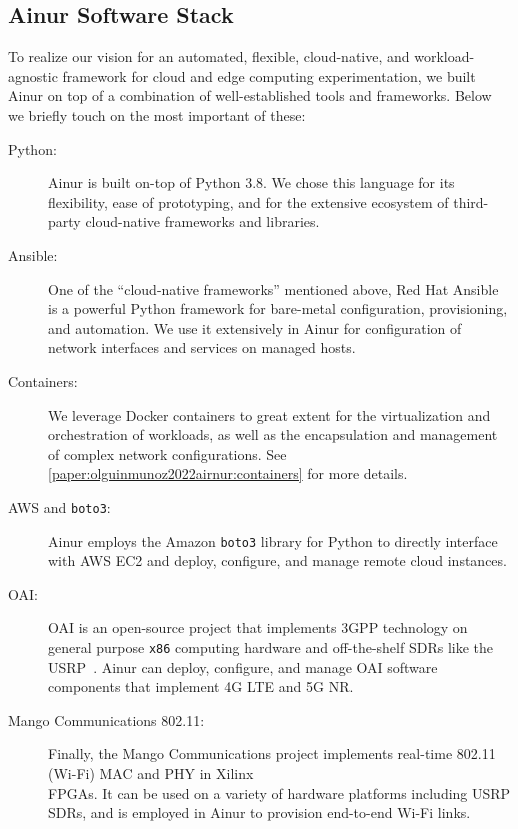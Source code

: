 \subsection{Ainur Software Stack}

To realize our vision for an automated, flexible, cloud-native, and workload-agnostic framework for cloud and edge computing experimentation, we built Ainur on top of a combination of well-established tools and frameworks.
Below we briefly touch on the most important of these:

\begin{description}
    \item[Python:]
    Ainur is built on-top of Python 3.8.
    We chose this language for its flexibility, ease of prototyping, and for the extensive ecosystem of third-party cloud-native frameworks and libraries.

    \item[Ansible:]
    One of the ``cloud-native frameworks'' mentioned above, Red Hat Ansible is a powerful Python framework for bare-metal configuration, provisioning, and automation.
    We use it extensively in Ainur for configuration of network interfaces and services on managed hosts.

    \item[Containers:]
    We leverage Docker containers to great extent for the virtualization and orchestration of workloads, as well as the encapsulation and management of complex network configurations.
    See \cref{paper:olguinmunoz2022airnur:containers} for more details.

    \item[\gls{AWS} and \texttt{boto3}:]
    Ainur employs the Amazon \texttt{boto3} library for Python to directly interface with \gls{AWS} \gls{EC2} and deploy, configure, and manage remote cloud instances.
    
    \item[\gls{OAI}:]
    \gls{OAI} is an open-source project that implements 3GPP technology on general purpose \texttt{x86} computing hardware and off-the-shelf \glspl{SDR} like the \gls{USRP}~\cite{kaltenberger2020openairinterface}.
    Ainur can deploy, configure, and manage \gls{OAI} software components that implement 4G \gls{LTE} and 5G \gls{NR}.
    
    \item[Mango Communications 802.11:]
    Finally, the Mango Communications project implements real-time 802.11 (Wi-Fi) MAC and PHY in Xilinx\\\glspl{FPGA}.
    It can be used on a variety of hardware platforms including \gls{USRP} \glspl{SDR}, and is employed in Ainur to provision end-to-end Wi-Fi links.
\end{description}

